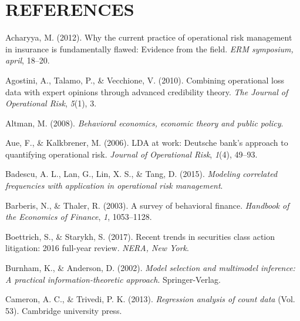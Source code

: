 \documentclass{DissertateUSU}
\begin{document}
\singlespacing

\FloatBarrier
\newpage
{}
\fancyhead[R]{\thepage}
\fancyfoot[C]{}

\chapter*{REFERENCES}

\setlength{\parindent}{-0.5in}
\setlength{\leftskip}{0.4in}
\setlength{\parskip}{6pt}

\noindent

\hypertarget{refs}{}
\leavevmode\hypertarget{ref-acharyya2012current}{}%
Acharyya, M. (2012). Why the current practice of operational risk
management in insurance is fundamentally flawed: Evidence from the
field. \emph{ERM symposium, april}, 18--20.

\leavevmode\hypertarget{ref-agostini2010combining}{}%
Agostini, A., Talamo, P., \& Vecchione, V. (2010). Combining operational
loss data with expert opinions through advanced credibility theory.
\emph{The Journal of Operational Risk}, \emph{5}(1), 3.

\leavevmode\hypertarget{ref-altman2008behavioral}{}%
Altman, M. (2008). \emph{Behavioral economics, economic theory and
public policy}.

\leavevmode\hypertarget{ref-aue2006lda}{}%
Aue, F., \& Kalkbrener, M. (2006). LDA at work: Deutsche bank's approach
to quantifying operational risk. \emph{Journal of Operational Risk},
\emph{1}(4), 49--93.

\leavevmode\hypertarget{ref-badescu2015modeling}{}%
Badescu, A. L., Lan, G., Lin, X. S., \& Tang, D. (2015). \emph{Modeling
correlated frequencies with application in operational risk management}.

\leavevmode\hypertarget{ref-barberis2003survey}{}%
Barberis, N., \& Thaler, R. (2003). A survey of behavioral finance.
\emph{Handbook of the Economics of Finance}, \emph{1}, 1053--1128.

\leavevmode\hypertarget{ref-boettrich2017recent}{}%
Boettrich, S., \& Starykh, S. (2017). Recent trends in securities class
action litigation: 2016 full-year review. \emph{NERA, New York}.

\leavevmode\hypertarget{ref-Burnham2002}{}%
Burnham, K., \& Anderson, D. (2002). \emph{Model selection and
multimodel inference: A practical information-theoretic approach}.
Springer-Verlag.

\leavevmode\hypertarget{ref-cameron2013regression}{}%
Cameron, A. C., \& Trivedi, P. K. (2013). \emph{Regression analysis of
count data} (Vol. 53). Cambridge university press.
\end{document}
